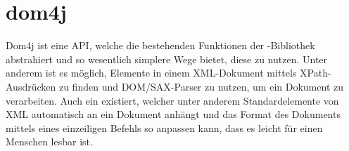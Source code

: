 \section{dom4j}

Dom4j ist eine API, welche die bestehenden Funktionen der -Bibliothek abstrahiert und so wesentlich simplere Wege bietet, diese zu nutzen.
Unter anderem ist es möglich, Elemente in einem XML-Dokument mittels XPath-Ausdrücken zu finden und DOM/SAX-Parser zu nutzen, um ein Dokument zu verarbeiten.
Auch ein  existiert, welcher unter anderem Standardelemente von XML automatisch an ein Dokument anhängt und das Format des Dokuments mittels eines einzeiligen Befehls so anpassen kann, dass es leicht für einen Menschen lesbar ist.




%
%
%
%
